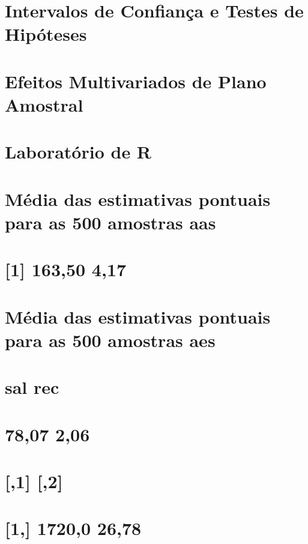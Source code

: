 \documentclass[]{book}
\theoremstyle{definition}
\theoremstyle{definition}
\theoremstyle{definition}
\theoremstyle{remark}
\begin{document}
\section{Intervalos de Confiança e Testes de Hipóteses}\label{icth}

\section{Efeitos Multivariados de Plano
Amostral}\label{efeitos-multivariados-de-plano-amostral}

\section{Laboratório de R}\label{laboratorio-de-r-1}

\section{Média das estimativas pontuais para as 500 amostras
aas}\label{media-das-estimativas-pontuais-para-as-500-amostras-aas}

\section{{[}1{]} 163,50 4,17}\label{section-14}

\section{Média das estimativas pontuais para as 500 amostras
aes}\label{media-das-estimativas-pontuais-para-as-500-amostras-aes}

\section{sal rec}\label{sal-rec}

\section{78,07 2,06}\label{section-15}

\section{{[},1{]} {[},2{]}}\label{section-16}

\section{{[}1,{]} 1720,0 26,78}\label{section-17}
\end{document}
